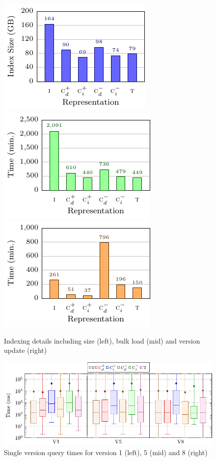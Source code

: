 \documentclass{llncs}
\begin{document}
\begin{figure}[t]
\includegraphics[scale=0.8]{plots/indexsize}
\includegraphics[scale=0.8]{plots/indextime}
\includegraphics[scale=0.8]{plots/updatetime}
\caption{Indexing details including size (left), bulk load (mid) and version update (right) \label{fig:index}}
\end{figure}

\begin{figure}[t]
\includegraphics[scale=0.75]{plots/boxplt-svq}
\caption{Single version query times for version 1 (left), 5 (mid) and 8 (right) \label{fig:svq}}
\end{figure}
\end{document}
